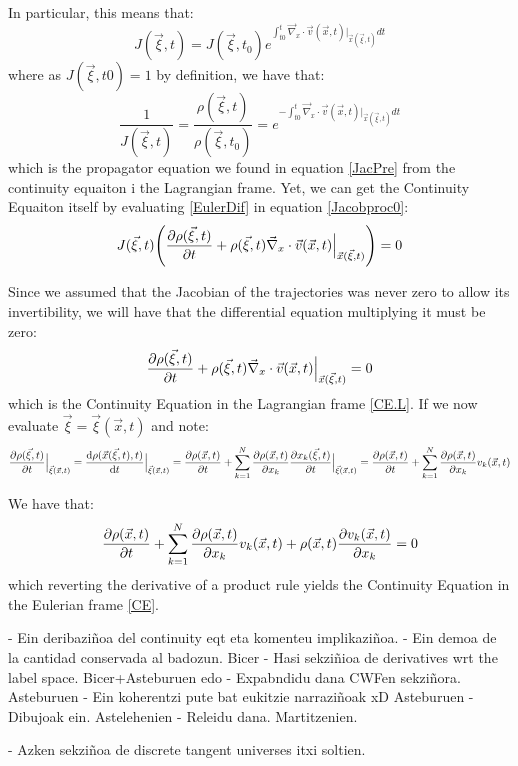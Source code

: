 \documentclass[11pt, a4paper]{article} %
\DeclareRobustCommand{\mybox}[2][gray!20]{%
\begin{tcolorbox}[   %
        left=1cm,
        right=1cm,
        top=0.5cm,
        bottom=0.5cm,
        colback=#1,
        colframe=#1,
        width=\dimexpr\textwidth\relax, 
        enlarge left by=0mm,
        boxsep=5pt,
        arc=0pt,outer arc=0pt,
        ]
        #2
\end{tcolorbox}
}
\begin{document}
{In particular, this means that:
\begin{equation}
J(\vec{\xi},t)=J(\vec{\xi},t_0)e^{\int_{t0}^t \vec{\nabla}_x\cdot\vec{v}(\vec{x},t)\Big\rvert_{\vec{x}(\vec{\xi},t)}dt}
\end{equation}
where as $J(\vec{\xi},t0)=1$ by definition, we have that:
\begin{equation}
\frac{1}{J(\vec{\xi},t)}=\frac{\rho(\vec{\xi},t)}{\rho(\vec{\xi},t_0)}=e^{-\int_{t0}^t \vec{\nabla}_x\cdot\vec{v}(\vec{x},t)\Big\rvert_{\vec{x}(\vec{\xi},t)}dt}
\end{equation}
which is the propagator equation we found in equation \eqref{JacPre} from the continuity equaiton i the Lagrangian frame. Yet, we can get the Continuity Equaiton itself by evaluating \eqref{EulerDif} in equation \eqref{Jacobproc0}:
\begin{equation}
J(\vec{\xi},t)\qty(\pdv{\rho(\vec{\xi},t)}{t}+\rho(\vec{\xi},t)\vec{\nabla}_x\cdot\vec{v}(\vec{x},t)\Big\rvert_{\vec{x}(\vec{\xi},t)})=0
\end{equation}
}
\mybox{
Since we assumed that the Jacobian of the trajectories was never zero to allow its invertibility, we will have that the differential equation multiplying it must be zero:
\begin{equation}
\pdv{\rho(\vec{\xi},t)}{t}+\rho(\vec{\xi},t)\vec{\nabla}_x\cdot\vec{v}(\vec{x},t)\Big\rvert_{\vec{x}(\vec{\xi},t)}=0
\end{equation}
which is the Continuity Equation in the Lagrangian frame \eqref{CE.L}. If we now evaluate $\vec{\xi}=\vec{\xi}(\vec{x},t)$ and note:
\begin{equation}
\pdv{\rho(\vec{\xi},t)}{t}\Big\rvert_{\vec{\xi}(\vec{x},t)}=\dv{\rho(\vec{x}(\vec{\xi},t),t)}{t}\Big\rvert_{\vec{\xi}(\vec{x},t)}=\pdv{\rho(\vec{x},t)}{t}+\sum_{k=1}^N\pdv{\rho(\vec{x},t)}{x_k}\pdv{x_k(\vec{\xi},t)}{t}\Big\rvert_{\vec{\xi}(\vec{x},t)}=\pdv{\rho(\vec{x},t)}{t}+\sum_{k=1}^N\pdv{\rho(\vec{x},t)}{x_k}v_k(\vec{x},t)
\end{equation}

We have that:
\begin{equation}
\pdv{\rho(\vec{x},t)}{t}+\sum_{k=1}^N\pdv{\rho(\vec{x},t)}{x_k}v_k(\vec{x},t)+\rho(\vec{x},t)\pdv{v_k(\vec{x},t)}{x_k}=0
\end{equation}
which reverting the derivative of a product rule yields the Continuity Equation in the Eulerian frame \eqref{CE}.


}
\mybox{


- Ein deribaziñoa del continuity eqt eta komenteu implikaziñoa. 
- Ein demoa de la cantidad conservada al badozun. Bicer
- Hasi sekziñioa de derivatives wrt the label space. Bicer+Asteburuen edo
- Expabndidu dana CWFen sekziñora. Asteburuen
- Ein koherentzi pute bat eukitzie narraziñoak xD Asteburuen
- Dibujoak ein. Astelehenien
- Releidu dana. Martitzenien.

- Azken sekziñoa de discrete tangent universes itxi soltien.
}
\end{document}
